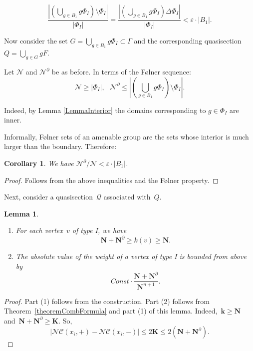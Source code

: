 \documentclass[12pt]{amsart}
\theoremstyle{plain}
\newtheorem{lemma}[theorem]{Lemma}
\newtheorem{corollary}[theorem]{Corollary}
\theoremstyle{definition}
\theoremstyle{plain}
\theoremstyle{definition}
\renewcommand{\geq}{\geqslant}
\begin{document}
$$\dfrac{\left|\left(\bigcup\limits_{g\in B_1}g\Phi_I \right)\setminus \Phi_I\right|}{\left|\Phi_I\right|} = \dfrac{\left|\left(\bigcup\limits_{g\in B_1}g\Phi_I \right)\Delta \Phi_I\right|}{\left|\Phi_I\right|}<\varepsilon \cdot |B_1|.$$

\medskip

Now consider the set $G = \bigcup\limits_{g\in B_1}g\Phi_I \subset \Gamma$ and the corresponding quasisection $Q = \bigcup\limits_{g\in G}gF$.


Let $\mathcal{N}$ and $\mathcal{N}^{\partial}$ be as before.
In terms of the F{\o}lner sequence:
$$\mathcal{N} \geq \left|\Phi_I\right|, \ \ \  \mathcal{N}^\partial\leqslant \left|\left(\bigcup_{g\in B_1}g\Phi_I \right)\setminus \Phi_I\right|.$$

Indeed, by Lemma \ref{LemmaInterior} the domains corresponding to $g\in \Phi_I$ are inner.

Informally, F{\o}lner sets of an amenable group are the sets whose interior is much larger than the boundary. Therefore: 

 \begin{corollary}\label{limit0} 
We have $\mathcal{N}^{\partial}/\mathcal{N}<\varepsilon \cdot |B_1|$. 
 \end{corollary}

 \begin{proof}
     Follows from the above inequalities and the F{\o}lner property.
 \end{proof}
 
 \iffalse
 
 \medskip
 Next, consider a quasisection~$\mathcal{Q}$  associated with~$Q$.
 \begin{lemma} \label{lemmaPower}
 \begin{enumerate}  In the notation of Lemma~\ref{lemmaCanc1} and Theorem~\ref{corAbsValue},
   \item For each vertex~$v$ of type I, we have 
   $$\mathbf{N} + \mathbf{N}^{\partial} \geq k(v)\geq \mathbf{N}.$$
   \item   The absolute value of the weight of a vertex of type I  is bounded from above by
   $$Const \cdot \frac{\mathbf{N} + \mathbf{N}^{\partial}}{\mathbf{N}^{n+1}}.$$
 \end{enumerate}
 \end{lemma}
 
\begin{proof}
 Part (1) follows from the construction. Part (2) follows from Theorem~\ref{theoremCombFormula} and part (1) of this lemma. Indeed,~$\mathbf{k}\geq \mathbf{N}$ and~$\mathbf{N}+\mathbf{N}^{\partial} \geq \mathbf{K}$. So,
 $$|\mathcal{NC}(x_i, +) - \mathcal{NC}(x_i, -)|\leqslant 2\mathbf{K}\leqslant 2(\mathbf{N}+\mathbf{N}^{\partial}).$$
\end{proof}
 
\end{document}
